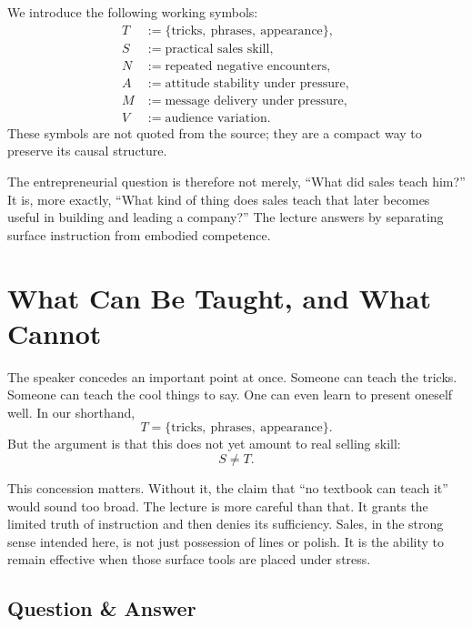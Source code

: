 \begin{definition}
We introduce the following working symbols:
\begin{align}
T &:= \{\text{tricks},\ \text{phrases},\ \text{appearance}\}, \\
S &:= \text{practical sales skill}, \\
N &:= \text{repeated negative encounters}, \\
A &:= \text{attitude stability under pressure}, \\
M &:= \text{message delivery under pressure}, \\
V &:= \text{audience variation}.
\end{align}
These symbols are not quoted from the source; they are a compact way to preserve its causal structure.
\end{definition}

The entrepreneurial question is therefore not merely, ``What did sales teach him?'' It is, more exactly, ``What kind of thing does sales teach that later becomes useful in building and leading a company?'' The lecture answers by separating surface instruction from embodied competence.

\section{What Can Be Taught, and What Cannot}

The speaker concedes an important point at once. Someone can teach the tricks. Someone can teach the cool things to say. One can even learn to present oneself well. In our shorthand,
\begin{equation}
T = \{\text{tricks},\ \text{phrases},\ \text{appearance}\}.
\end{equation}
But the argument is that this does not yet amount to real selling skill:
\begin{equation}
S \neq T.
\end{equation}

This concession matters. Without it, the claim that ``no textbook can teach it'' would sound too broad. The lecture is more careful than that. It grants the limited truth of instruction and then denies its sufficiency. Sales, in the strong sense intended here, is not just possession of lines or polish. It is the ability to remain effective when those surface tools are placed under stress.

\subsection{Question \& Answer}

